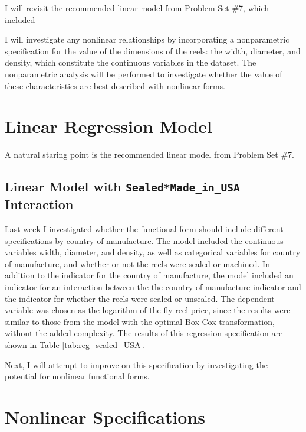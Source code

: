 I will revisit the recommended linear model
from Problem Set \#7, 
which included 



I will investigate any nonlinear relationships
by incorporating a nonparametric specification
for the value of the dimensions of the reels:
the width, diameter, and density, 
which constitute the continuous variables in the dataset.
The nonparametric analysis will be performed
to investigate whether the value of these characteristics
are best described with nonlinear forms. 


\clearpage
\section{Linear Regression Model}

A natural staring point is the recommended linear model
from Problem Set \#7. 

\subsection{Linear Model with \texttt{Sealed*Made\_in\_USA} Interaction}

Last week I investigated whether 
the functional form should include different specifications by
country of manufacture.
% 
The model included the continuous variables 
width, diameter, and density, 
as well as categorical variables for 
country of manufacture, 
and whether or not the reels were sealed or machined. 
% 
In addition to the indicator for the country of manufacture, the model included an indicator for an interaction between
the the country of manufacture indicator and the indicator for whether the reels were sealed or unsealed. 
% 
The dependent variable was chosen as 
the logarithm of the fly reel price, 
since the results were similar to those from the model 
with the optimal Box-Cox transformation, 
without the added complexity. 
% 
The results of this regression specification are shown in 
Table \ref{tab:reg_sealed_USA}. 
% 

% 
Next, I will attempt to improve on this specification
by investigating the potential for nonlinear functional forms. 







\clearpage
\section{Nonlinear Specifications}


